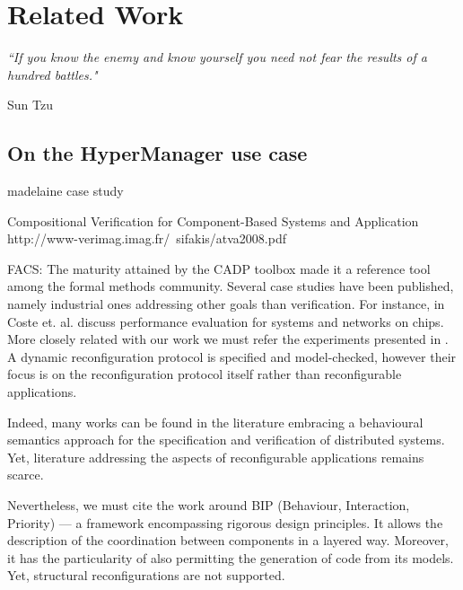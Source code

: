 
\chapter{Related Work} 
\label{chap:related} 


\epigraph{\textit{“If you know the enemy and know yourself you need 
                             not fear the results of a hundred battles."}}{Sun Tzu}

\minitoc



\section{On the HyperManager use case}
\label{sec:relhyper}


	\cite{BHHM:FACS11} madelaine case study
	
	
	Compositional Verification for Component-Based Systems and Application
	http://www-verimag.imag.fr/~sifakis/atva2008.pdf
	\cite{BBN+10} 


	FACS:
	  The maturity attained by the CADP toolbox 
		made it a reference tool among the formal methods community.  Several case studies have been published, 
		namely industrial ones addressing other goals than verification. For instance, in \cite{conf/cav/CosteHLS09}
	Coste et. al. discuss performance evaluation for systems and networks on chips.			
	 More closely related with our work we must refer the experiments presented in 
	 \cite{conf/dais/CornejoGMP01}. A dynamic reconfiguration protocol is specified and model-checked,
	 however their focus is on the reconfiguration protocol itself rather than reconfigurable applications.
		 
		  	
		Indeed, many works can be found in the literature embracing a behavioural semantics
		approach for the specification and verification of distributed systems. Yet, 
		literature addressing the aspects of reconfigurable applications remains 
		scarce. 

		
 Nevertheless, we must cite the work around
	    BIP (Behaviour, Interaction, Priority) \cite{BBB+11a} --- a framework 
	 encompassing rigorous design principles. It allows the description of the 
	 coordination between components
	 in a layered way. Moreover, it has the particularity of also permitting the 
	 generation of code from its models. Yet, structural reconfigurations are not supported. 
	 	
